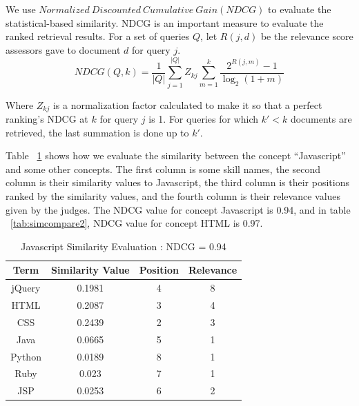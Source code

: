 We use $ Normalized~Discounted~Cumulative~Gain ( NDCG )$ to evaluate the statistical-based similarity. NDCG is an important measure to evaluate the ranked retrieval results. For a set of queries $Q$, let $R(j,d)$ be the relevance score assessors gave to document $d$ for query $j$.
       $$ NDCG(Q,k) = \frac {1}{|Q|} \sum_{j=1}^{|Q|}{Z_{kj}} \sum_{m=1}^{k} \frac{2^{R(j,m)} - 1}{ \log_2(1+m)} $$

Where $Z_{kj}$ is a normalization factor calculated to make it so that a perfect ranking's NDCG at $k$ for query $j$ is 1. For queries for which $k' < k$ documents are retrieved, the last summation is done up to $k'$.

Table ~\ref{tab:simcompare1} shows how we evaluate the similarity between the concept ``Javascript'' and some other concepts. The first column is some skill names, the second column is their similarity values to Javascript, the third column is their positions ranked by the similarity values, and the fourth column is their relevance values given by the judges. The NDCG value for concept Javascript is 0.94, and in table ~\ref{tab:simcompare2},  NDCG value for concept HTML is 0.97.

\begin{table}
\centering
\caption{ Javascript Similarity Evaluation : NDCG = 0.94 }
\begin{tabular}{ | c | c | c  | c |  }
 \hline
    Term     &  Similarity Value  &  Position   & Relevance     \\  \hline
    jQuery   &  0.1981            &      4      &   8        \\
     HTML    &  0.2087            &      3      &   4         \\
     CSS     &  0.2439            &      2      &   3   \\
     Java    &  0.0665            &      5      &   1   \\
    Python   &  0.0189            &      8      &   1   \\
     Ruby    &  0.023             &      7      &   1    \\
     JSP     &  0.0253            &      6      &   2    \\
 \hline
\end{tabular}
\label{tab:simcompare1}
\end{table}


